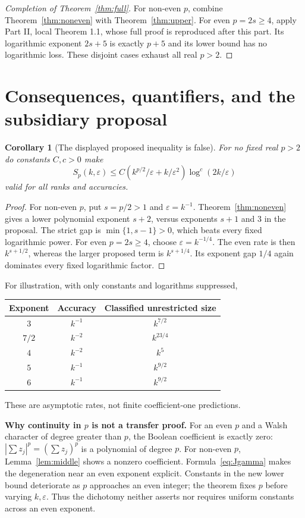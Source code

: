 \documentclass[11pt]{article}
\newtheorem{corollary}[theorem]{Corollary}
\theoremstyle{remark}\newtheorem{remark}[theorem]{Remark}
\newcommand{\eps}{\varepsilon}\newcommand{\norm}[1]{\left\|#1\right\|}
\begin{document}
\begin{proof}[Completion of Theorem~\ref{thm:full}]
For non-even $p$, combine Theorem~\ref{thm:noneven} with Theorem~\ref{thm:upper}. For even $p=2s\ge4$, apply Part II, local Theorem 1.1, whose full proof is reproduced after this part. Its logarithmic exponent $2s+5$ is exactly $p+5$ and its lower bound has no logarithmic loss. These disjoint cases exhaust all real $p>2$.
\end{proof}

\section{Consequences, quantifiers, and the subsidiary proposal}
\begin{corollary}[The displayed proposed inequality is false]\label{cor:proposal}
For no fixed real $p>2$ do constants $C,c>0$ make
\[
 S_p(k,\eps)\le C\left(k^{p/2}/\eps+k/\eps^2\right)\log^c(2k/\eps)
\]
valid for all ranks and accuracies.
\end{corollary}
\begin{proof}
For non-even $p$, put $s=p/2>1$ and $\eps=k^{-1}$. Theorem~\ref{thm:noneven} gives a lower polynomial exponent $s+2$, versus exponents $s+1$ and $3$ in the proposal. The strict gap is $\min\{1,s-1\}>0$, which beats every fixed logarithmic power. For even $p=2s\ge4$, choose $\eps=k^{-1/4}$. The even rate is then $k^{s+1/2}$, whereas the larger proposed term is $k^{s+1/4}$. Its exponent gap $1/4$ again dominates every fixed logarithmic factor.
\end{proof}
For illustration, with only constants and logarithms suppressed,
\begin{center}
\begin{tabular}{ccc}
\toprule
Exponent & Accuracy & Classified unrestricted size\\
\midrule
$3$ & $k^{-1}$ & $k^{7/2}$\\
$7/2$ & $k^{-2}$ & $k^{23/4}$\\
$4$ & $k^{-2}$ & $k^5$\\
$5$ & $k^{-1}$ & $k^{9/2}$\\
$6$ & $k^{-1}$ & $k^{9/2}$\\
\bottomrule
\end{tabular}
\end{center}
These are asymptotic rates, not finite coefficient-one predictions.

\textbf{Why continuity in $p$ is not a transfer proof.}
For an even $p$ and a Walsh character of degree greater than $p$, the Boolean coefficient is exactly zero: $|\sum z_j|^p=(\sum z_j)^p$ is a polynomial of degree $p$. For non-even $p$, Lemma~\ref{lem:middle} shows a nonzero coefficient. Formula~\eqref{eq:Jgamma} makes the degeneration near an even exponent explicit. Constants in the new lower bound deteriorate as $p$ approaches an even integer; the theorem fixes $p$ before varying $k,\eps$. Thus the dichotomy neither asserts nor requires uniform constants across an even exponent.
\end{document}
